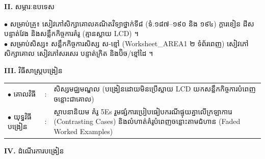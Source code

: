 \documentclass[a4paper,10pt]{article}
\newcommand{\en}[1]{{\TimesEn #1}}
\begin{document}
{%
\textbf{II.} {\muol សម្ភារៈឧបទេស}\\[1pt]
\hspace*{0.55cm}\parbox[t]{18.2cm}{$\bullet$ \hspace{0.25cm} សម្រាប់គ្រូ៖ សៀវភៅសិក្សាគោលគណិតវិទ្យាថ្នាក់ទី៨ (ទំ.១៨៧--១៩០ និង ១៩៤) ក្ដារខៀន ដីស បន្ទាត់វែង និងសន្លឹកកិច្ចការគំរូ (គ្មានស្លាយ \en{LCD}) ។\\
$\bullet$ \hspace{0.25cm} សម្រាប់សិស្ស៖ សន្លឹកកិច្ចការសិស្ស ស-ខ្មៅ (\en{Worksheet\_AREA1} ២ ទំព័រពេញ) សៀវភៅសិក្សាគោល សៀវភៅសរសេរ បន្ទាត់ក្រិត និងប៊ិច/ខ្មៅដៃ ។}

\vspace{2pt}

\textbf{III.} {\muol វិធីសាស្រ្តបង្រៀន}\\[1pt]
\hspace*{0.45cm}%
\begin{tabular}{@{}l l L{14.85cm}@{}}
  $\bullet$ \hspace{0.25cm} គោលវិធី & : & សិស្សមជ្ឈមណ្ឌល (បង្រៀនដោយមិនប្រើស្លាយ \en{LCD} យកសន្លឹកកិច្ចការបំពេញចន្លោះជាគោល) \\
  $\bullet$ \hspace{0.25cm} យុទ្ធវិធីបង្រៀន & : & ស្ថាបនានិយម គំរូ \en{5Es} រួមផ្សំការប្រៀបធៀបករណីផ្ទុយគ្នាលើក្រឡាការេ (\en{Contrasting Cases}) និងលំហាត់គំរូបំពេញចន្លោះតាមជំហាន (\en{Faded Worked Examples}) \\
\end{tabular}
}

\vspace{2pt}

\textbf{IV.} {\muol ដំណើរការបង្រៀន}

\vspace{1pt}
\end{document}
